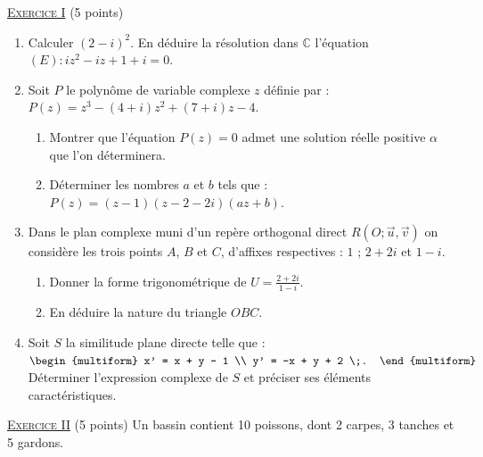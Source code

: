 \noindent \underline{\textsc{Exercice I}} (5 points) 
      \begin{enumerate}
            \item Calculer $(2 - i)^2$. 
                  En déduire la résolution dans $\mathbb{C}$ l'équation $(E) : iz^2 - iz + 1 + i = 0$.
            \item Soit $P$ le polynôme de variable complexe $z$ définie par : $P(z) = z^3 - (4+i)z^2 + (7+i)z - 4$.
                  \begin{enumerate}
                        \item Montrer que l’équation $P(z) = 0$ admet une solution 
                              réelle positive $\alpha$ que l’on déterminera.
                        \item Déterminer les nombres $a$ et $b$ tels que : $P(z) = (z - 1) (z - 2 - 2i) (az + b)$.
                  \end{enumerate}
            \item Dans le plan complexe muni d’un repère orthogonal direct $R(O;\vec{u},\vec{v})$ on consid\`ere les
                  trois points $A$, $B$ et $C$, d’affixes respectives : $1$ ; $2 + 2i$ et $1 - i$.
                  \begin{enumerate}
                        \item Donner la forme trigonométrique de $U = \frac{2+2i}{1-i}$.
                        \item En déduire la nature du triangle $OBC$.
                  \end{enumerate}
            \item Soit $S$ la similitude plane directe telle que :
                  $\displaystyle{ \begin{multiform} x' = x + y - 1 \\ y' = -x + y + 2 \;. \end{multiform} }$
                  Déterminer l’expression complexe de $S$ et préciser ses éléments caractéristiques.
      \end{enumerate}
\noindent \underline{\textsc{Exercice II}} (5 points) \newline
      Un bassin contient 10 poissons, dont 2 carpes, 3 tanches et 5 gardons.
